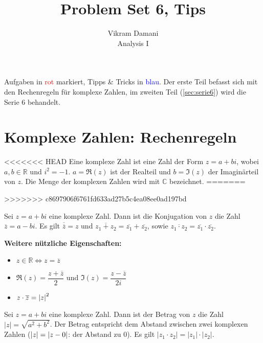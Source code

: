 \documentclass[12pt]{article}
\newcommand{\R}{\mathbb{R}} %
\newcommand{\C}{\mathbb{C}}
\newenvironment{definition}[2][Definition]{\begin{trivlist}
        \item[\hskip \labelsep {\bfseries #1}\hskip \labelsep {\bfseries #2.}]}{\flushright{$\square$}\end{trivlist}}
\begin{document}
\title{Problem Set 6, Tips}
\author{Vikram Damani\\
        Analysis I}

\maketitle
Aufgaben in \textcolor{red}{rot} markiert, Tipps \& Tricks in \textcolor{blue}{blau}. Der erste Teil befasst sich mit den Rechenregeln für komplexe Zahlen, im zweiten Teil (\ref{sec:serie6}) wird die Serie 6 behandelt.

\section{Komplexe Zahlen: Rechenregeln}
\begin{definition}{[Komplexe Zahl]}
<<<<<<< HEAD
        Eine komplexe Zahl ist eine Zahl der Form $z=a+bi$, wobei $a,b\in\R$ und $i^2=-1$. $a=\Re{(z)}$ ist der Realteil und $b=\Im{(z)}$ der Imaginärteil von $z$. Die Menge der komplexen Zahlen wird mit $\C$ bezeichnet.
=======
    
>>>>>>> c8697906f6761fd633ad27b5c4ea08ee0ad197bd
\end{definition}

\begin{definition}{[Konjugation]}
        Sei $z=a+bi$ eine komplexe Zahl. Dann ist die Konjugation von $z$ die Zahl $\overline{z}=a-bi$. Es gilt $\overline{\overline{z}}=z$ und $\overline{z_1+z_2}=\overline{z_1}+\overline{z_2}$, sowie $\overline{z_1\cdot z_2}=\overline{z_1}\cdot\overline{z_2}$.

        \textbf{Weitere nützliche Eigenschaften:}
        \begin{itemize}
                \item $z\in\R\iff z=\overline{z}$
                \item $\Re{(z)}=\dfrac{z+\overline{z}}{2}$ und $\Im{(z)}=\dfrac{z-\overline{z}}{2i}$
                \item  $z\cdot\overline{z}=\abs{z}^2$
        \end{itemize}
\end{definition}

\begin{definition}{[Betrag]}
        Sei $z=a+bi$ eine komplexe Zahl. Dann ist der Betrag von $z$ die Zahl $|z|=\sqrt{a^2+b^2}$. Der Betrag entspricht dem Abstand zwischen zwei komplexen Zahlen ($\abs{z} =\abs{z-0}$: der Abstand zu $0$). Es gilt $|z_1\cdot z_2|=|z_1|\cdot|z_2|$.
\end{definition}
\end{document}
